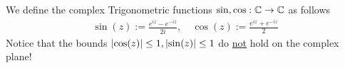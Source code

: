 




\begin{ndefinition}
We define the complex Trigonometric functions $\sin, \cos: \mathbb{C} \to \mathbb{C}$ as follows
\begin{align*}
				\sin(z) := \frac{e^{iz} - e^{-iz}}{2i}, \quad \cos(z) := \frac{e^{iz} + e^{-iz}}{2}
\end{align*}
Notice that the bounds $\abs{\cos(z)} \leq 1, \abs{\sin(z)} \leq 1$ do \underline{not} hold on the complex plane!
\end{ndefinition}




